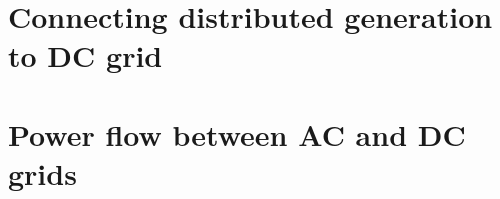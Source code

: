 \documentclass{report}
\begin{document}
\chapter{Connecting distributed generation to DC grid}

\chapter{Power flow between AC and DC grids}



 
 
\end{document}
